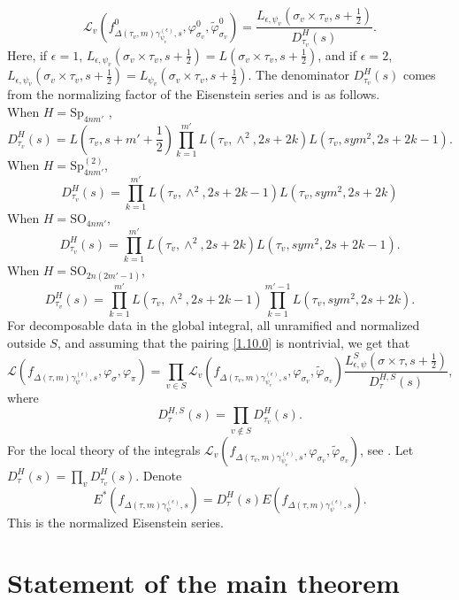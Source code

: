\documentclass[12pts]{amsart}
\newcommand{\SO}{{\mathrm{SO}}}
\newcommand{\Sp}{{\mathrm{Sp}}}
\begin{document}
\begin{equation}\label{1.10.8}
\mathcal{L}_v(f^0_{\Delta(\tau_v,m)\gamma^{(\epsilon)}_{\psi_v},s},\varphi^0_{\sigma_v}, \tilde{\varphi}^0_{\sigma_v})=\frac{L_{\epsilon,\psi_v}(\sigma_v\times \tau_v,s+\frac{1}{2})}{D_{\tau_v}^H(s)}.
\end{equation}
Here, if $\epsilon=1$, $L_{\epsilon,\psi_v}(\sigma_v\times \tau_v,s+\frac{1}{2})=L(\sigma_v\times \tau_v,s+\frac{1}{2})$, and if $\epsilon=2$, 
$L_{\epsilon,\psi_v}(\sigma_v\times \tau_v,s+\frac{1}{2})=L_{\psi_v}(\sigma_v\times \tau_v,s+\frac{1}{2})$. The denominator $D_{\tau_v}^H(s)$ comes from the normalizing factor of the Eisenstein series and is as follows.\\
When $H=\Sp_{4nm'}$ ,
$$
D^H_{\tau_v}(s)=L(\tau_v,s+m'+\frac{1}{2})\prod_{k=1}^{m'}L(\tau_v,\wedge^2,2s+2k)L(\tau_v,sym^2,2s+2k-1).
$$
When $H=\Sp^{(2)}_{4nm'}$,
$$
D^H_{\tau_v}(s)=\prod_{k=1}^{m'}L(\tau_v,\wedge^2,2s+2k-1)L(\tau_v,sym^2,2s+2k)
$$
When $H=\SO_{4nm'}$,
$$
D^H_{\tau_v}(s)=\prod_{k=1}^{m'}L(\tau_v,\wedge^2,2s+2k)L(\tau_v,sym^2,2s+2k-1).
$$
When $H=\SO_{2n(2m'-1)}$,
$$
D^H_{\tau_v}(s)=\prod_{k=1}^{m'}L(\tau_v,\wedge^2,2s+2k-1)\prod_{k=1}^{m'-1}L(\tau_v,sym^2,2s+2k).
$$
For decomposable data in the global integral, all unramified and normalized outside $S$, and assuming that the pairing \eqref{1.10.0} is nontrivial, we get that
\begin{equation}\label{1.11}
\mathcal{L}(f_{\Delta(\tau,m)\gamma^{(\epsilon)}_\psi,s},\varphi_\sigma, \varphi_\pi)=\prod_{v\in S} \mathcal{L}_v(f_{\Delta(\tau_v,m)\gamma^{(\epsilon)}_{\psi_v},s},\varphi_{\sigma_v}, \tilde{\varphi}_{\sigma_v})\frac{L^S_{\epsilon,\psi}(\sigma\times \tau,s+\frac{1}{2})}{D_\tau^{H,S}(s)},
\end{equation}
where 
$$
D^{H,S}_\tau(s)=\prod_{v\notin S} D^H_{\tau_v}(s). 
$$
For the local theory of the  integrals $\mathcal{L}_v(f_{\Delta(\tau_v,m)\gamma^{(\epsilon)}_{\psi_v},s},\varphi_{\sigma_v}, \tilde{\varphi}_{\sigma_v})$, see \cite{CFK18}. Let $D^H_\tau(s)=\prod_v D^H_{\tau_v}(s)$. Denote
\begin{equation}\label{1.12}
E^*(f_{\Delta(\tau,
	m)\gamma^{(\epsilon)}_\psi,s})=D^H_\tau(s)E(f_{\Delta(\tau,
	m)\gamma^{(\epsilon)}_\psi,s}).
\end{equation}
This is the normalized Eisenstein series.

\section{Statement of the main theorem}
\end{document}
